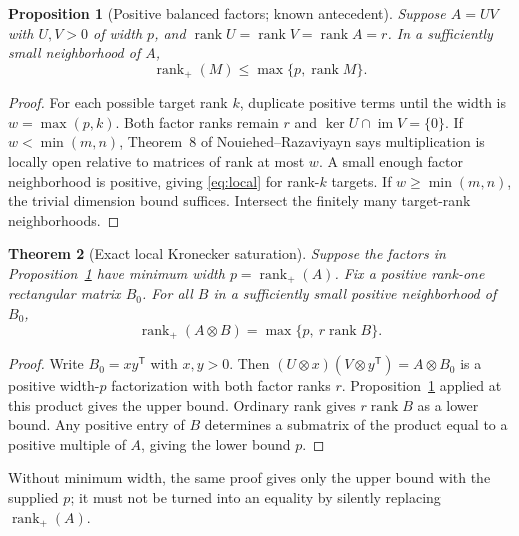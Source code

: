 \documentclass[11pt]{article}
\newtheorem{theorem}{Theorem}[section]
\newtheorem{proposition}[theorem]{Proposition}
\theoremstyle{definition}\newtheorem{definition}[theorem]{Definition}
\theoremstyle{remark}\newtheorem{remark}[theorem]{Remark}
\newcommand{\rk}{\operatorname{rank}}
\newcommand{\rp}{\operatorname{rank}_{+}}
\newcommand{\im}{\operatorname{im}}
\begin{document}
\begin{proposition}[Positive balanced factors; known antecedent]\label{prop:local}
Suppose $A=UV$ with $U,V>0$ of width $p$, and $\rk U=\rk V=\rk A=r$. In a sufficiently small neighborhood of $A$,
\begin{equation}\label{eq:local}
\rp(M)\le\max\{p,\rk M\}.
\end{equation}
\end{proposition}
\begin{proof}
For each possible target rank $k$, duplicate positive terms until the width is $w=\max(p,k)$. Both factor ranks remain $r$ and $\ker U\cap\im V=\{0\}$. If $w<\min(m,n)$, Theorem~8 of Nouiehed--Razaviyayn \cite{NR} says multiplication is locally open relative to matrices of rank at most $w$. A small enough factor neighborhood is positive, giving \eqref{eq:local} for rank-$k$ targets. If $w\ge\min(m,n)$, the trivial dimension bound suffices. Intersect the finitely many target-rank neighborhoods.
\end{proof}

\begin{theorem}[Exact local Kronecker saturation]\label{thm:localtensor}
Suppose the factors in Proposition~\ref{prop:local} have minimum width $p=\rp(A)$. Fix a positive rank-one rectangular matrix $B_0$. For all $B$ in a sufficiently small positive neighborhood of $B_0$,
\begin{equation}\label{eq:localtensor}
\boxed{\quad\rp(A\otimes B)=\max\{p,\ r\rk B\}.\quad}
\end{equation}
\end{theorem}
\begin{proof}
Write $B_0=xy^{\mathsf T}$ with $x,y>0$. Then $(U\otimes x)(V\otimes y^{\mathsf T})=A\otimes B_0$ is a positive width-$p$ factorization with both factor ranks $r$. Proposition~\ref{prop:local} applied at this product gives the upper bound. Ordinary rank gives $r\rk B$ as a lower bound. Any positive entry of $B$ determines a submatrix of the product equal to a positive multiple of $A$, giving the lower bound $p$.
\end{proof}

Without minimum width, the same proof gives only the upper bound with the supplied $p$; it must not be turned into an equality by silently replacing $\rp(A)$.
\end{document}
